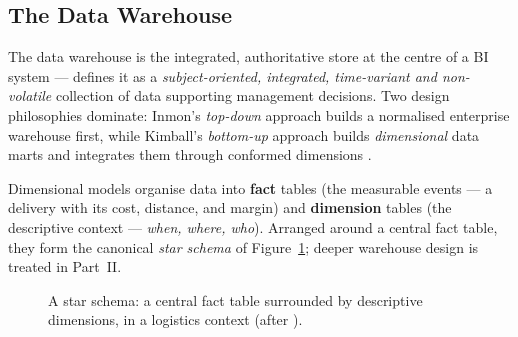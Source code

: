 \subsection{The Data Warehouse}

The data warehouse is the integrated, authoritative store at the centre of a BI system ---
\textcite{inmon2005} defines it as a \emph{subject-oriented, integrated, time-variant and non-volatile}
collection of data supporting management decisions. Two design philosophies dominate: Inmon's
\emph{top-down} approach builds a normalised enterprise warehouse first, while Kimball's
\emph{bottom-up} approach builds \emph{dimensional} data marts and integrates them through conformed
dimensions \parencite{kimball2013}.

Dimensional models organise data into \textbf{fact} tables (the measurable events --- \eg a delivery
with its cost, distance, and margin) and \textbf{dimension} tables (the descriptive context ---
\emph{when, where, who}). Arranged around a central fact table, they form the canonical \emph{star
schema} of Figure~\ref{fig:ch1-star-schema}; deeper warehouse design is treated in Part~II.

\begin{figure}[htbp]
\centering
{}
\caption{A star schema: a central fact table surrounded by descriptive dimensions, in a logistics
context (after \textcite{kimball2013}).}
\label{fig:ch1-star-schema}
\end{figure}

